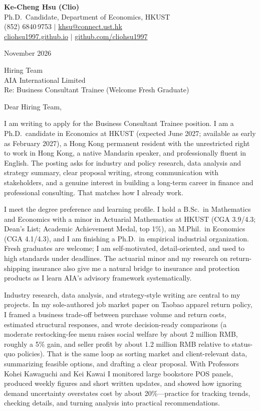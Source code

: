 \documentclass[11pt,letterpaper]{article}
\begin{document}
\noindent
{\bfseries Ke-Cheng Hsu (Clio)}\\
Ph.D.\ Candidate, Department of Economics, HKUST\\
(852) 6840\,9753 \quad $|$ \quad \href{mailto:khsu@connect.ust.hk}{khsu@connect.ust.hk}\\
\href{https://cliohsu1997.github.io/}{cliohsu1997.github.io} \quad $|$ \quad \href{https://github.com/cliohsu1997}{github.com/cliohsu1997}

\vspace{0.3em}
 November 2026

\vspace{0.2em}
\noindent
Hiring Team\\
AIA International Limited\\
Re: Business Consultant Trainee (Welcome Fresh Graduate)

\vspace{0.1em}
Dear Hiring Team,

I am writing to apply for the Business Consultant Trainee position. I am a Ph.D.\ candidate in Economics at HKUST (expected June 2027; available as early as February 2027), a Hong Kong permanent resident with the unrestricted right to work in Hong Kong, a native Mandarin speaker, and professionally fluent in English. The posting asks for industry and policy research, data analysis and strategy summary, clear proposal writing, strong communication with stakeholders, and a genuine interest in building a long-term career in finance and professional consulting. That matches how I already work.

I meet the degree preference and learning profile. I hold a B.Sc.\ in Mathematics and Economics with a minor in Actuarial Mathematics at HKUST (CGA 3.9/4.3; Dean's List; Academic Achievement Medal, top 1\%), an M.Phil.\ in Economics (CGA 4.1/4.3), and I am finishing a Ph.D.\ in empirical industrial organization. Fresh graduates are welcome; I am self-motivated, detail-oriented, and used to high standards under deadlines. The actuarial minor and my research on return-shipping insurance also give me a natural bridge to insurance and protection products as I learn AIA's advisory framework systematically.

Industry research, data analysis, and strategy-style writing are central to my projects. In my sole-authored job market paper on Taobao apparel return policy, I framed a business trade-off between purchase volume and return costs, estimated structural responses, and wrote decision-ready comparisons (a moderate restocking-fee menu raises social welfare by about 2 million RMB, roughly a 5\% gain, and seller profit by about 1.2 million RMB relative to status-quo policies). That is the same loop as sorting market and client-relevant data, summarizing feasible options, and drafting a clear proposal. With Professors Kohei Kawaguchi and Kei Kawai I monitored large bookstore POS panels, produced weekly figures and short written updates, and showed how ignoring demand uncertainty overstates cost by about 20\%---practice for tracking trends, checking details, and turning analysis into practical recommendations.
\end{document}
